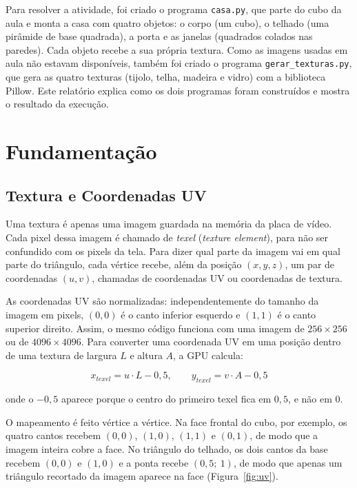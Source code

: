 \documentclass{article}
\begin{document}
Para resolver a atividade, foi criado o programa \texttt{casa.py}, que parte do cubo da aula e monta a casa com quatro objetos: o corpo (um cubo), o telhado (uma pirâmide de base quadrada), a porta e as janelas (quadrados colados nas paredes). Cada objeto recebe a sua própria textura. Como as imagens usadas em aula não estavam disponíveis, também foi criado o programa \texttt{gerar\_texturas.py}, que gera as quatro texturas (tijolo, telha, madeira e vidro) com a biblioteca Pillow. Este relatório explica como os dois programas foram construídos e mostra o resultado da execução.

\section{Fundamentação}

\subsection{Textura e Coordenadas UV}\label{sec:uv}

Uma textura é apenas uma imagem guardada na memória da placa de vídeo. Cada pixel dessa imagem é chamado de \textit{texel} (\textit{texture element}), para não ser confundido com os pixels da tela. Para dizer qual parte da imagem vai em qual parte do triângulo, cada vértice recebe, além da posição $(x, y, z)$, um par de coordenadas $(u, v)$, chamadas de coordenadas UV ou coordenadas de textura.

As coordenadas UV são normalizadas: independentemente do tamanho da imagem em pixels, $(0, 0)$ é o canto inferior esquerdo e $(1, 1)$ é o canto superior direito. Assim, o mesmo código funciona com uma imagem de $256\times256$ ou de $4096\times4096$. Para converter uma coordenada UV em uma posição dentro de uma textura de largura $L$ e altura $A$, a GPU calcula:

\begin{equation}\label{eq:uv_texel}
x_{texel} = u \cdot L - 0{,}5, \qquad y_{texel} = v \cdot A - 0{,}5
\end{equation}

\noindent onde o $-0{,}5$ aparece porque o centro do primeiro texel fica em $0{,}5$, e não em $0$.

O mapeamento é feito vértice a vértice. Na face frontal do cubo, por exemplo, os quatro cantos recebem $(0,0)$, $(1,0)$, $(1,1)$ e $(0,1)$, de modo que a imagem inteira cobre a face. No triângulo do telhado, os dois cantos da base recebem $(0,0)$ e $(1,0)$ e a ponta recebe $(0{,}5;\ 1)$, de modo que apenas um triângulo recortado da imagem aparece na face (Figura~\ref{fig:uv}).
\end{document}
